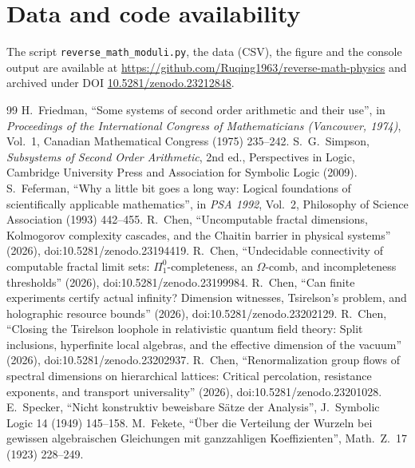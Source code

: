 \documentclass[11pt]{article}
\theoremstyle{definition}\newtheorem{definition}{Definition}[section]
\theoremstyle{remark}\newtheorem*{remark}{Remark}
\newcommand{\paperdoi}{10.5281/zenodo.23212848}
\begin{document}
\section*{Data and code availability}
The script \texttt{reverse\_math\_moduli.py}, the data (CSV), the figure and the console output are available at
\url{https://github.com/Ruqing1963/reverse-math-physics} and archived under DOI \href{https://doi.org/\paperdoi}{\paperdoi}.

\begingroup\raggedright
\begin{thebibliography}{99}\small
{} H.~Friedman, ``Some systems of second order arithmetic and their use'', in \emph{Proceedings of the International Congress of Mathematicians (Vancouver, 1974)}, Vol.~1, Canadian Mathematical Congress (1975) 235--242.
 S.~G.~Simpson, \emph{Subsystems of Second Order Arithmetic}, 2nd ed., Perspectives in Logic, Cambridge University Press and Association for Symbolic Logic (2009).
 S.~Feferman, ``Why a little bit goes a long way: Logical foundations of scientifically applicable mathematics'', in \emph{PSA 1992}, Vol.~2, Philosophy of Science Association (1993) 442--455.
 R.~Chen, ``Uncomputable fractal dimensions, Kolmogorov complexity cascades, and the Chaitin barrier in physical systems'' (2026), doi:10.5281/zenodo.23194419.
 R.~Chen, ``Undecidable connectivity of computable fractal limit sets: $\Pi^0_1$-completeness, an $\Omega$-comb, and incompleteness thresholds'' (2026), doi:10.5281/zenodo.23199984.
 R.~Chen, ``Can finite experiments certify actual infinity? Dimension witnesses, Tsirelson's problem, and holographic resource bounds'' (2026), doi:10.5281/zenodo.23202129.
 R.~Chen, ``Closing the Tsirelson loophole in relativistic quantum field theory: Split inclusions, hyperfinite local algebras, and the effective dimension of the vacuum'' (2026), doi:10.5281/zenodo.23202937.
 R.~Chen, ``Renormalization group flows of spectral dimensions on hierarchical lattices: Critical percolation, resistance exponents, and transport universality'' (2026), doi:10.5281/zenodo.23201028.
 E.~Specker, ``Nicht konstruktiv beweisbare S\"atze der Analysis'', J.\ Symbolic Logic 14 (1949) 145--158.
 M.~Fekete, ``\"Uber die Verteilung der Wurzeln bei gewissen algebraischen Gleichungen mit ganzzahligen Koeffizienten'', Math.\ Z.\ 17 (1923) 228--249.

\end{thebibliography}
\end{document}
